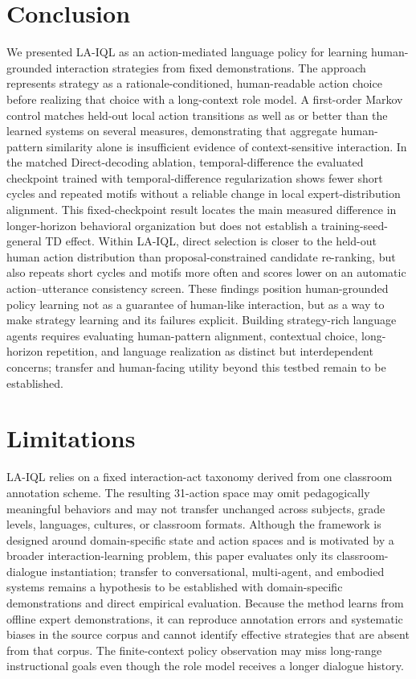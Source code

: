 \documentclass[manuscript,review,anonymous]{acmart}
\begin{document}
\section{Conclusion}

We presented LA-IQL as an action-mediated language policy for learning
human-grounded interaction strategies from fixed demonstrations. The approach
represents strategy as a rationale-conditioned, human-readable action choice
before realizing that choice with a long-context role model. A first-order
Markov control matches held-out local action transitions as well as or better
than the learned systems on several measures, demonstrating that aggregate
human-pattern similarity alone is insufficient evidence of context-sensitive
interaction. In the matched Direct-decoding ablation, temporal-difference
the evaluated checkpoint trained with temporal-difference regularization shows
fewer short cycles and repeated motifs without a reliable change in local
expert-distribution alignment. This fixed-checkpoint result locates the main
measured difference in longer-horizon behavioral organization but does not
establish a training-seed-general TD effect. Within LA-IQL,
direct selection is closer to the held-out human
action distribution than proposal-constrained candidate re-ranking, but also
repeats short cycles and motifs more often and scores lower on an automatic
action--utterance consistency screen. These findings position human-grounded
policy learning not as a guarantee of human-like interaction, but as a way to
make strategy learning and its failures explicit. Building strategy-rich
language agents requires evaluating human-pattern alignment, contextual
choice, long-horizon repetition, and language realization as distinct but
interdependent concerns; transfer and human-facing utility beyond this testbed
remain to be established.

\label{main-content-end}

\section*{Limitations}

LA-IQL relies on a fixed interaction-act taxonomy derived from one classroom annotation scheme.
The resulting 31-action space may omit pedagogically meaningful behaviors and may not transfer unchanged across subjects, grade levels, languages, cultures, or classroom formats.
Although the framework is designed around domain-specific state and action spaces and is motivated by a broader interaction-learning problem, this paper evaluates only its classroom-dialogue instantiation; transfer to conversational, multi-agent, and embodied systems remains a hypothesis to be established with domain-specific demonstrations and direct empirical evaluation.
Because the method learns from offline expert demonstrations, it can reproduce annotation errors and systematic biases in the source corpus and cannot identify effective strategies that are absent from that corpus.
The finite-context policy observation may miss long-range instructional goals even though the role model receives a longer dialogue history.
\end{document}
